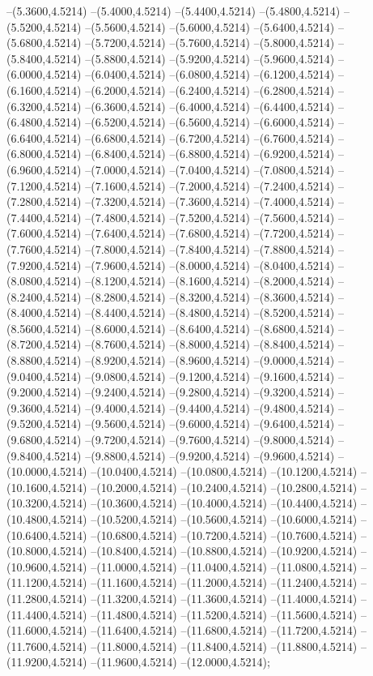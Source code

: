 {	--(5.3600,4.5214)
	--(5.4000,4.5214)
	--(5.4400,4.5214)
	--(5.4800,4.5214)
	--(5.5200,4.5214)
	--(5.5600,4.5214)
	--(5.6000,4.5214)
	--(5.6400,4.5214)
	--(5.6800,4.5214)
	--(5.7200,4.5214)
	--(5.7600,4.5214)
	--(5.8000,4.5214)
	--(5.8400,4.5214)
	--(5.8800,4.5214)
	--(5.9200,4.5214)
	--(5.9600,4.5214)
	--(6.0000,4.5214)
	--(6.0400,4.5214)
	--(6.0800,4.5214)
	--(6.1200,4.5214)
	--(6.1600,4.5214)
	--(6.2000,4.5214)
	--(6.2400,4.5214)
	--(6.2800,4.5214)
	--(6.3200,4.5214)
	--(6.3600,4.5214)
	--(6.4000,4.5214)
	--(6.4400,4.5214)
	--(6.4800,4.5214)
	--(6.5200,4.5214)
	--(6.5600,4.5214)
	--(6.6000,4.5214)
	--(6.6400,4.5214)
	--(6.6800,4.5214)
	--(6.7200,4.5214)
	--(6.7600,4.5214)
	--(6.8000,4.5214)
	--(6.8400,4.5214)
	--(6.8800,4.5214)
	--(6.9200,4.5214)
	--(6.9600,4.5214)
	--(7.0000,4.5214)
	--(7.0400,4.5214)
	--(7.0800,4.5214)
	--(7.1200,4.5214)
	--(7.1600,4.5214)
	--(7.2000,4.5214)
	--(7.2400,4.5214)
	--(7.2800,4.5214)
	--(7.3200,4.5214)
	--(7.3600,4.5214)
	--(7.4000,4.5214)
	--(7.4400,4.5214)
	--(7.4800,4.5214)
	--(7.5200,4.5214)
	--(7.5600,4.5214)
	--(7.6000,4.5214)
	--(7.6400,4.5214)
	--(7.6800,4.5214)
	--(7.7200,4.5214)
	--(7.7600,4.5214)
	--(7.8000,4.5214)
	--(7.8400,4.5214)
	--(7.8800,4.5214)
	--(7.9200,4.5214)
	--(7.9600,4.5214)
	--(8.0000,4.5214)
	--(8.0400,4.5214)
	--(8.0800,4.5214)
	--(8.1200,4.5214)
	--(8.1600,4.5214)
	--(8.2000,4.5214)
	--(8.2400,4.5214)
	--(8.2800,4.5214)
	--(8.3200,4.5214)
	--(8.3600,4.5214)
	--(8.4000,4.5214)
	--(8.4400,4.5214)
	--(8.4800,4.5214)
	--(8.5200,4.5214)
	--(8.5600,4.5214)
	--(8.6000,4.5214)
	--(8.6400,4.5214)
	--(8.6800,4.5214)
	--(8.7200,4.5214)
	--(8.7600,4.5214)
	--(8.8000,4.5214)
	--(8.8400,4.5214)
	--(8.8800,4.5214)
	--(8.9200,4.5214)
	--(8.9600,4.5214)
	--(9.0000,4.5214)
	--(9.0400,4.5214)
	--(9.0800,4.5214)
	--(9.1200,4.5214)
	--(9.1600,4.5214)
	--(9.2000,4.5214)
	--(9.2400,4.5214)
	--(9.2800,4.5214)
	--(9.3200,4.5214)
	--(9.3600,4.5214)
	--(9.4000,4.5214)
	--(9.4400,4.5214)
	--(9.4800,4.5214)
	--(9.5200,4.5214)
	--(9.5600,4.5214)
	--(9.6000,4.5214)
	--(9.6400,4.5214)
	--(9.6800,4.5214)
	--(9.7200,4.5214)
	--(9.7600,4.5214)
	--(9.8000,4.5214)
	--(9.8400,4.5214)
	--(9.8800,4.5214)
	--(9.9200,4.5214)
	--(9.9600,4.5214)
	--(10.0000,4.5214)
	--(10.0400,4.5214)
	--(10.0800,4.5214)
	--(10.1200,4.5214)
	--(10.1600,4.5214)
	--(10.2000,4.5214)
	--(10.2400,4.5214)
	--(10.2800,4.5214)
	--(10.3200,4.5214)
	--(10.3600,4.5214)
	--(10.4000,4.5214)
	--(10.4400,4.5214)
	--(10.4800,4.5214)
	--(10.5200,4.5214)
	--(10.5600,4.5214)
	--(10.6000,4.5214)
	--(10.6400,4.5214)
	--(10.6800,4.5214)
	--(10.7200,4.5214)
	--(10.7600,4.5214)
	--(10.8000,4.5214)
	--(10.8400,4.5214)
	--(10.8800,4.5214)
	--(10.9200,4.5214)
	--(10.9600,4.5214)
	--(11.0000,4.5214)
	--(11.0400,4.5214)
	--(11.0800,4.5214)
	--(11.1200,4.5214)
	--(11.1600,4.5214)
	--(11.2000,4.5214)
	--(11.2400,4.5214)
	--(11.2800,4.5214)
	--(11.3200,4.5214)
	--(11.3600,4.5214)
	--(11.4000,4.5214)
	--(11.4400,4.5214)
	--(11.4800,4.5214)
	--(11.5200,4.5214)
	--(11.5600,4.5214)
	--(11.6000,4.5214)
	--(11.6400,4.5214)
	--(11.6800,4.5214)
	--(11.7200,4.5214)
	--(11.7600,4.5214)
	--(11.8000,4.5214)
	--(11.8400,4.5214)
	--(11.8800,4.5214)
	--(11.9200,4.5214)
	--(11.9600,4.5214)
	--(12.0000,4.5214);
}
